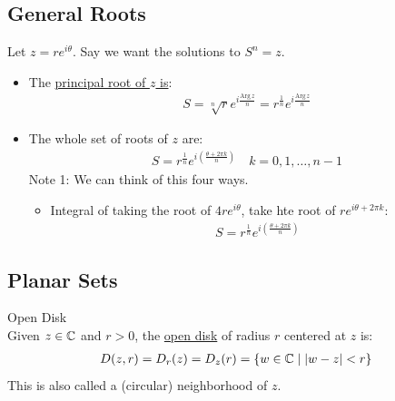\documentclass[10pt]{paper}
\newcommand{\gspc}{\vspace{0.13cm}} %
\newcommand{\gline}[0]{\gspc\\} %
\newcommand{\cpr}[1]{\left(#1\right)}
\newcommand{\Arg}{\mathrm{Arg}\,}
\newcommand{\ul}[1]{\underline{#1}}
\begin{document}
\subsection{General Roots}
Let $z = re^{i\theta}$. Say we want the solutions to ${S}^n = z$.
\begin{itemize}
  \item The \ul{principal \enth root of $z$ is}:
  \begin{align*}
    S = \sqrt[n]r e^{i\frac{\Arg{z}}n} = r^{\frac{1}n}e^{i\frac{\Arg{z}}n}
  \end{align*}
  \item The whole set of \enth roots of $z$ are:
  \begin{align*}
    S = r^{\frac{1}n}e^{i\cpr{\frac{\theta+2\pi k}n}}\quad k = 0,1,\ldots, n -1
  \end{align*}
  Note 1: We can think of this four ways.
  \begin{itemize}
    \item Integral of taking the \enth root of $4re^{i\theta}$, take hte \enth root of $re^{i\theta + 2\pi k}$:
    \begin{align*}
      S = r^{\frac{1}n}e^{i\cpr{\frac{\theta+2\pi k}n}}
    \end{align*}
  \end{itemize}
\end{itemize}
\subsection{Planar Sets}
\begin{definition}{Open Disk}{}\gline{}
  Given $z\in\mathbb{C}$ and $r>0$, the \ul{open disk} of radius $r$ centered at $z$ is:
  \begin{align*}
    D(z, r)=D_r(z)=D_z(r)=\{w\in\mathbb{C}\mid |w-z|<r\}
  \end{align*}
  This is also called a (circular) neighborhood of $z$. 
\end{definition}
\end{document}
